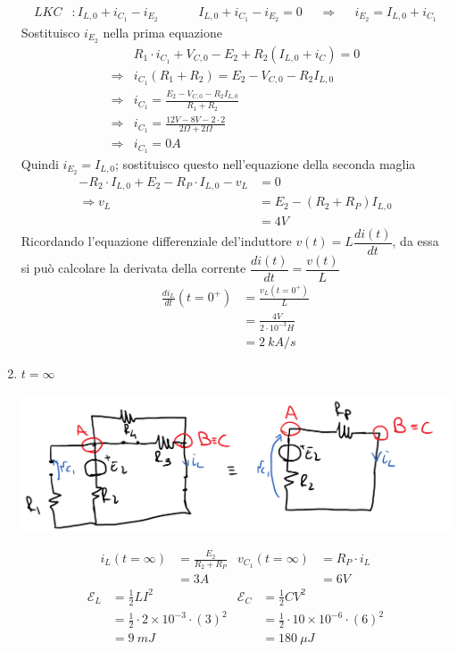 \documentclass{article}
\begin{document}
\begin{enumerate}[label=\protect\circled{\arabic*}]
\begin{align*}
        LKC&:I_{L,0}+i_{C_1}-i_{E_2} & & & &
        I_{L,0} + i_{C_1} - i_{E_2}=0 & &\Rightarrow & &i_{E_2} = I_{L,0}+i_{C_1}
    \end{align*}
    Sostituisco $i_{E_2}$ nella prima equazione
    \begin{align*}
        &R_1\cdot i_{C_1} + V_{C,0}-E_2+R_2\left(I_{L,0}+i_C\right)=0\\
        \Rightarrow& i_{C_1}(R_1+R_2) = E_2-V_{C,0}-R_2I_{L,0}\\
        \Rightarrow& i_{C_1} = \frac{E_2-V_{C,0}-R_2I_{L,0}}{R_1+R_2}\\
        \Rightarrow& i_{C_1} = \frac{12V-8V-2 \cdot 2}{2\Omega+2\Omega}\\
        \Rightarrow& i_{C_1}=0A
    \end{align*}
    Quindi $i_{E_2}=I_{L,0}$; sostituisco questo nell'equazione della seconda maglia
    \begin{align*}
        -R_2\cdot I_{L,0}+E_2-R_P\cdot I_{L,0}-v_L&=0\\
        \Rightarrow v_L&=E_2-(R_2+R_P)I_{L,0}\\
        &=4V
    \end{align*}
    Ricordando l'equazione differenziale del'induttore $v(t) = L \dfrac{di(t)}{dt}$, da essa si può calcolare la derivata della corrente $\dfrac{di(t)}{dt} = \dfrac{v(t)}{L}$
    \begin{align*}
        \frac{di_L}{dt}(t=0^+) &= \frac{v_L(t=0^+)}{L} \\
        &=\frac{4V}{2\cdot 10^{-3}H}\\
        &=2 \ kA/s
    \end{align*}
    \item $t = \infty$
    \begin{center}
        \includegraphics[scale=0.25]{Image/Es_3_Trans_3.png}
    \end{center}
    \begin{align*}
        i_L(t=\infty) &= \frac{E_2}{R_2+R_P} & v_{C_1}(t=\infty) &= R_P\cdot i_L\\
        &=3A & &=6V
    \end{align*}
    \begin{align*}
        \mathcal{E}_L &= \frac{1}{2}LI^2 & \mathcal{E}_C&=\frac{1}{2}CV^2 \\
        &=\frac{1}{2}\cdot 2 \times 10^{-3} \cdot(3)^2 & &=\frac{1}{2}\cdot 10 \times 10^{-6}\cdot(6)^2\\
        &=9 \ mJ & &= 180 \ \mu J 
    \end{align*}
\end{enumerate}
\end{document}
